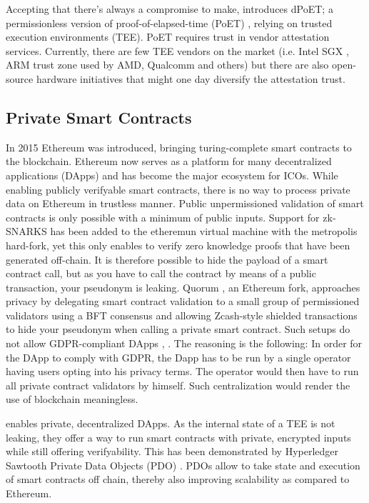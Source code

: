 \documentclass[conference]{IEEEtran}
\begin{document}
Accepting that there's always a compromise to make, \encointer introduces dPoET; a permissionless version of proof-of-elapsed-time (PoET) \cite{poet}, relying on trusted execution environments (TEE). PoET requires trust in vendor attestation services. Currently, there are few TEE vendors on the market (i.e. Intel SGX \cite{costan16}, ARM trust zone \cite{trustzone} used by AMD, Qualcomm and others) but there are also open-source hardware initiatives that might one day diversify the attestation trust. 

\subsection{Private Smart Contracts}
In 2015 Ethereum \cite{ethereum} was introduced, bringing turing-complete smart contracts to the blockchain. Ethereum now serves as a platform for many decentralized applications (DApps) and has become the major ecosystem for ICOs. While enabling publicly verifyable smart contracts, there is no way to process private data on Ethereum in trustless manner. Public unpermissioned validation of smart contracts is only possible with a minimum of public inputs. Support for zk-SNARKS has been added to the etheremun virtual machine with the metropolis hard-fork, yet this only enables to verify zero knowledge proofs that have been generated off-chain. It is therefore possible to hide the payload of a smart contract call, but as you have to call the contract by means of a public transaction, your pseudonym is leaking. Quorum \cite{quorum}, an Ethereum fork, approaches privacy by delegating smart contract validation to a small group of permissioned validators using a BFT consensus and allowing Zcash-style shielded transactions to hide your pseudonym when calling a private smart contract. Such setups do not allow GDPR-compliant DApps \cite{gdpr}, \cite{gdprbc}. The reasoning is the following: In order for the DApp to comply with GDPR, the Dapp has to be run by a single operator having users opting into his privacy terms. The operator would then have to run all private contract validators by himself. Such centralization would render the use of blockchain meaningless.

\encointer enables private, decentralized DApps. As the internal state of a TEE is not leaking, they offer a way to run smart contracts with private, encrypted inputs while still offering verifyability. This has been demonstrated by Hyperledger Sawtooth Private Data Objects (PDO) \cite{sawtoothpdo}. PDOs allow to take state and execution of smart contracts off chain, thereby also improving scalability as compared to Ethereum.
\end{document}
